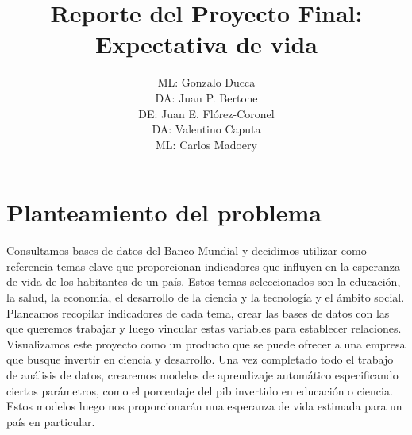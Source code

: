 \documentclass{other/docTemplate}
\author{ML: Gonzalo Ducca \formatemail{gonzaloducca@gmail.com} \\ DA: Juan P. Bertone \formatemail{bertonejpb@gmail.com} \\ DE: Juan E. Flórez-Coronel \formatemail{juan.florez@upr.edu} \\ DA: Valentino Caputa \formatemail{caputavalentino@gmail.com} \\ ML: Carlos Madoery \formatemail{ccmadoery@gmail.com}}
\title{Reporte del Proyecto Final: Expectativa de vida}
\begin{document}
 
\maketitle

\startTable
{}
\stopTable

\tabladecontenido
\newpage
\listadetablas
\newpage
\listadefiguras
\newpage
\printglossary[title=Lista de Acronimos ,type=\acronymtype]
\clearpage




\section{Planteamiento del problema}
Consultamos bases de datos del Banco Mundial y decidimos utilizar como referencia temas clave que proporcionan indicadores que influyen en la esperanza de vida de los habitantes de un país. Estos temas seleccionados son la educación, la salud, la economía, el desarrollo de la ciencia y la tecnología y el ámbito social.
Planeamos recopilar indicadores de cada tema, crear las bases de datos con las que queremos trabajar y luego vincular estas variables para establecer relaciones. Visualizamos este proyecto como un producto que se puede ofrecer a una empresa que busque invertir en ciencia y desarrollo.
Una vez completado todo el trabajo de análisis de datos, crearemos modelos de aprendizaje automático especificando ciertos parámetros, como el porcentaje del \gls{pib} invertido en educación o ciencia. Estos modelos luego nos proporcionarán una esperanza de vida estimada para un país en particular.
\end{document}
